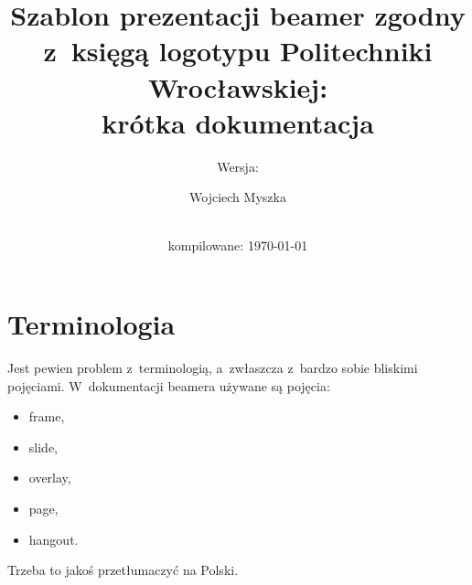 \usepackage{hologo}
\usepackage{listings}
\lstset{style=beamer}

{
}

\usepackage{pifont}

\newcommand{\cmark}{\ding{51}}%
\newcommand{\xmark}{\ding{55}}%
\newcommand{\done}{\rlap{$\square$}{\raisebox{2pt}{\large\hspace{1pt}\cmark}}%
 \hspace{-2.5pt}}
\newcommand{\wontfix}{\rlap{$\square$}{\large\hspace{1pt}\xmark}}
\newcommand{\emptybox}{$\square$}


\usepackage{hyperref}

\title{Szablon prezentacji beamer zgodny\\ z~księgą logotypu Politechniki Wrocławskiej:\\ krótka dokumentacja}
\subtitle{Wersja: \VCRevisionMod}
\author{Wojciech Myszka}
\date{\BZRBuildDate\\ kompilowane: \today}





\begin{frame}[plain]
 \maketitle
\end{frame}

\ifpdf
 \tableofcontents
\fi

\section{Terminologia}

Jest pewien problem z~terminologią, a~zwłaszcza z~bardzo sobie bliskimi pojęciami. W~dokumentacji beamera używane są pojęcia:
\begin{itemize}
 \item
       frame,
 \item
       slide,
 \item
       overlay,
 \item
       page,
 \item
       hangout.
\end{itemize}
Trzeba to jakoś przetłumaczyć na Polski.

